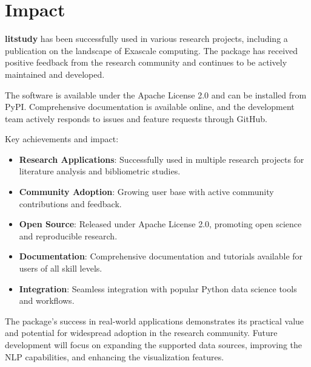 \section{Impact}

\textbf{litstudy} has been successfully used in various research projects, including a publication on the landscape of Exascale computing. The package has received positive feedback from the research community and continues to be actively maintained and developed.

The software is available under the Apache License 2.0 and can be installed from PyPI. Comprehensive documentation is available online, and the development team actively responds to issues and feature requests through GitHub.

Key achievements and impact:

\begin{itemize}
\item \textbf{Research Applications}: Successfully used in multiple research projects for literature analysis and bibliometric studies.
\item \textbf{Community Adoption}: Growing user base with active community contributions and feedback.
\item \textbf{Open Source}: Released under Apache License 2.0, promoting open science and reproducible research.
\item \textbf{Documentation}: Comprehensive documentation and tutorials available for users of all skill levels.
\item \textbf{Integration}: Seamless integration with popular Python data science tools and workflows.
\end{itemize}

The package's success in real-world applications demonstrates its practical value and potential for widespread adoption in the research community. Future development will focus on expanding the supported data sources, improving the NLP capabilities, and enhancing the visualization features.
